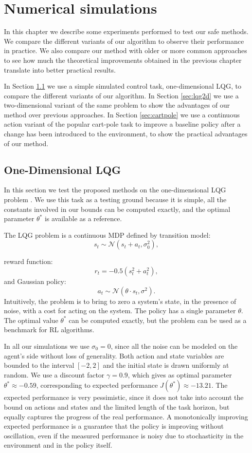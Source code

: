 \chapter{Numerical simulations}\label{chap:simul}

In this chapter we describe some experiments performed to test our safe methods. We compare the different variants of our algorithm to observe their performance in practice. We also compare our method with older or more common approaches to see how much the theoretical improvements obtained in the previous chapter translate into better practical results.

In Section \ref{sec:lqg1d} we use a simple simulated control task, one-dimensional \ac{LQG}, to compare the different variants of our algorithm.
In Section \ref{sec:lqg2d} we use a two-dimensional variant of the same problem to show the advantages of our method over previous approaches.
In Section \ref{sec:cartpole} we use a continuous action variant of the popular cart-pole task to improve a baseline policy after a change has been introduced to the environment, to show the practical advantages of our method.

\section{One-Dimensional LQG}\label{sec:lqg1d}
In this section we test the proposed methods on the one-dimensional \ac{LQG} problem \cite{4867}. We use this task as a testing ground because it is simple, all the constants involved in our bounds can be computed exactly, and the optimal parameter $\theta^*$ is available as a reference.

The LQG problem is a continuous \ac{MDP} defined by transition model:
\[
	s_t \sim \mathcal{N}(s_t+a_t,\sigma_0^2),
\] 

reward function:
\[
	r_t=-0.5(s_t^2+a_t^2),
\]
and Gaussian policy:
\[
	a_t \sim \mathcal{N}(\theta\cdot s_t,\sigma^2).
\]
Intuitively, the problem is to bring to zero a system's state, in the presence of noise, with a cost for acting on the system.
The policy has a single parameter $\theta$. The optimal value $\theta^*$ can be computed exactly, but the problem can be used as a benchmark for \ac{RL} algorithms.

In all our simulations we use $\sigma_0 = 0$, since all the noise can be modeled on the agent's side without loss of generality. Both action and state variables are bounded to the interval $[-2,2]$ and the initial state is drawn uniformly at random.  
We use a discount factor $\gamma=0.9$, which gives as optimal parameter $\theta^* \approx -0.59$, corresponding to expected performance $J(\theta^*) \approx -13.21$. The expected performance is very pessimistic, since it does not take into account the bound on actions and states and the limited length of the task horizon, but equally captures the progress of the real performance. A monotonically improving expected performance is a guarantee that the policy is improving without oscillation, even if the measured performance is noisy due to stochasticity in the environment and in the policy itself.
